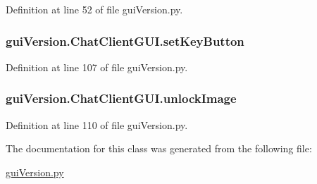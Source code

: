Definition at line 52 of file gui\+Version.\+py.

\hypertarget{classgui_version_1_1_chat_client_g_u_i_a6f8fa5385bc6fa43fe07f02151b54dac}{}
\subsubsection[{set\+Key\+Button}]{\setlength{\rightskip}{0pt plus 5cm}gui\+Version.\+Chat\+Client\+G\+U\+I.\+set\+Key\+Button}\label{classgui_version_1_1_chat_client_g_u_i_a6f8fa5385bc6fa43fe07f02151b54dac}


Definition at line 107 of file gui\+Version.\+py.

\hypertarget{classgui_version_1_1_chat_client_g_u_i_ac9bcddaa82b6d786fa50638f18fd814b}{}
\subsubsection[{unlock\+Image}]{\setlength{\rightskip}{0pt plus 5cm}gui\+Version.\+Chat\+Client\+G\+U\+I.\+unlock\+Image}\label{classgui_version_1_1_chat_client_g_u_i_ac9bcddaa82b6d786fa50638f18fd814b}


Definition at line 110 of file gui\+Version.\+py.



The documentation for this class was generated from the following file\+:\begin{DoxyCompactItemize}
\item 
\hyperlink{gui_version_8py}{gui\+Version.\+py}\end{DoxyCompactItemize}
